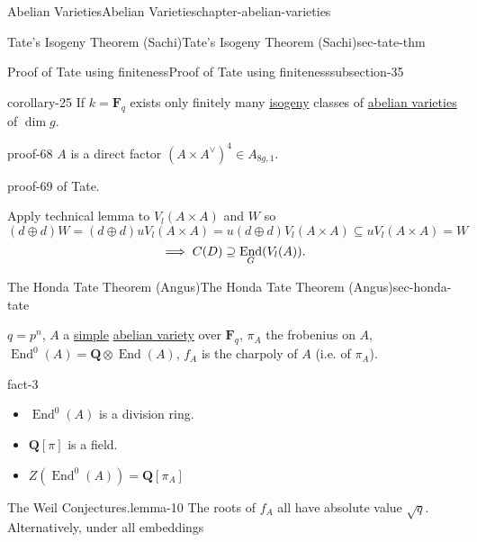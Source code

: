 \documentclass[oneside,10pt,]{book}
\renewcommand{\qedhere}{\relax}
\numberwithin{equation}{section}
\newcommand{\lb}{[}
\newcommand{\rb}{]}
\newcommand{\QQ}{\mathbf{Q}}
\newcommand{\FF}{\mathbf{F}}
\DeclareMathOperator{\End}{End}
\begin{document}
\begin{chapterptx}{Abelian Varieties}{}{Abelian Varieties}{}{}{chapter-abelian-varieties}
\begin{sectionptx}{Tate's Isogeny Theorem (Sachi)}{}{Tate's Isogeny Theorem (Sachi)}{}{}{sec-tate-thm}
\begin{subsectionptx}{Proof of Tate using finiteness}{}{Proof of Tate using finiteness}{}{}{subsection-35}
\begin{corollary}{}{}{corollary-25}
\hypertarget{p-398}{}%
If \(k = \FF_q\) exists only finitely many \hyperref[def-supersing-isog-isog]{isogeny} classes of \hyperref[def-buntes-abvar]{abelian varieties} of \(\dim g\).%
\end{corollary}
\begin{proofptx}{}{proof-68}
\hypertarget{p-399}{}%
\(A\) is a direct factor \((A\times A^\vee)^4 \in A_{8g,1}\).%
\end{proofptx}
\begin{proofptx}{}{proof-69}
\hypertarget{p-400}{}%
of Tate.%
\par
\hypertarget{p-401}{}%
Apply technical lemma to \(V_l(A\times A)\) and \(W\) so%
\begin{equation*}
(d\oplus d) W = (d \oplus d) uV_l(A\times A) = u(d\oplus d) V_l(A\times A) \subseteq uV_l(A\times A) = W
\end{equation*}
%
\begin{equation*}
\implies C(D) \supseteq \End_G(V_l(A))\text{.}\qedhere
\end{equation*}
%
\end{proofptx}
\end{subsectionptx}
\end{sectionptx}
%
%
\typeout{************************************************}
\typeout{************************************************}
%
\begin{sectionptx}{The Honda Tate Theorem (Angus)}{}{The Honda Tate Theorem (Angus)}{}{}{sec-honda-tate}
\begin{introduction}{}%
\hypertarget{p-402}{}%
\(q = p^n\), \(A\) a \hyperref[def-simple-av]{simple} \hyperref[def-buntes-abvar]{abelian variety} over \(\FF_q\), \(\pi_A\) the frobenius on \(A\), \(\End^0(A) = \QQ\otimes \End(A)\), \(f_A\) is the charpoly of \(A\) (i.e. of \(\pi_A\)).%
\begin{fact}{}{}{fact-3}%
\hypertarget{p-403}{}%
\leavevmode%
\begin{itemize}[label=\textbullet]
\item{}\(\End^0(A)\) is a division ring.%
\item{}\(\QQ\lb \pi\rb\) is a field.%
\item{}\(Z(\End^0(A)) = \QQ\lb \pi_A\rb\)%
\end{itemize}
%
\end{fact}
\begin{lemma}{The Weil Conjectures.}{}{lemma-10}%
\hypertarget{p-404}{}%
The roots of \(f_A\) all have absolute value \(\sqrt q\). Alternatively, under all embeddings%

\end{lemma}
\end{introduction}
\end{sectionptx}
\end{chapterptx}
\end{document}
